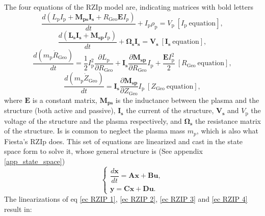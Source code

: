 \documentclass[a4paper,12pt,oneside]{book}
\newcommand{\p}{\partial}
\begin{document}
The four equations of the RZIp model are, indicating matrices with bold letters \cite{AtiSharmaTesis}
%
\begin{equation}\label{ec RZIP 1}
\dfrac{d(L_\text{p} I_\text{p} + \boldsymbol{M_{ps}I_\text{s}}+ R_\text{Geo}\boldsymbol{E} I_p)}{dt}+I_\text{p} \rho_\text{p}=V_\text{p} \ [I_\text{p} \ \text{equation}],
\end{equation}
%
\begin{equation}\label{ec RZIP 2}
\dfrac{d(\boldsymbol{L_\text{s} I_\text{s}+M_\text{sp}}I_\text{p})}{dt}+ \boldsymbol{ \Omega_\text{s} I_\text{s}}=\boldsymbol{V_\text{s}} \ [\boldsymbol{I_\text{s}} \  \text{equation}],
\end{equation}
%
\begin{equation}\label{ec RZIP 3}
\dfrac{d(m_\text{p} \dot{R}_\text{Geo})}{dt}=\dfrac{1}{2}I_\text{p}^2 \dfrac{\p L_\text{p}}{\p R_\text{Geo}}+ \boldsymbol{I_\text{s}} \dfrac{\p \boldsymbol{M_\text{sp}}}{\p R_\text{Geo}}I_\text{p}+ \dfrac{\boldsymbol{E} I_\text{p}^2}{2} \ [R_\text{Geo} \  \text{equation}],
\end{equation}
%
\begin{equation}\label{ec RZIP 4}
\dfrac{d(m_\text{p} \dot{Z}_\text{Geo})}{dt}=\boldsymbol{I_\text{s}} \dfrac{\p \boldsymbol{M_\text{sp}}}{\p Z_\text{Geo}}I_\text{p} \ [Z_\text{Geo} \ \text{equation}],
\end{equation}
%
where $ \boldsymbol{E}$ is a constant matrix, $\boldsymbol{M_\text{ps}}$ is the inductance between the plasma and the structure (both active and passive), $\boldsymbol{I_\text{s}}$ the current of the structure, $\boldsymbol{V_\text{s}}$ and $V_\text{p}$ the voltage of the structure and the plasma respectively, and $\boldsymbol{\Omega_\text{s}}$ the resistance matrix of the structure. Is is common to neglect the plasma mass $m_p$, which is also what Fiesta's RZIp does. This set of equations are linearized and cast in the state space form to solve it, whose general structure is (See appendix \ref{app_state_space})
%
\begin{equation}\label{ec stat spa, general}
\left\{
\begin{array}{c}
\dfrac{d\boldsymbol{x}}{dt}=\boldsymbol{A} \boldsymbol{x} +\boldsymbol{B} \boldsymbol{u}, \\
\boldsymbol{y}=\boldsymbol{C}\boldsymbol{x} +\boldsymbol{D} \boldsymbol{u}.
\end{array}
\right.
\end{equation}
%
The linearizations of eq \eqref{ec RZIP 1}, \eqref{ec RZIP 2}, \eqref{ec RZIP 3} and \eqref{ec RZIP 4} result in:
\end{document}
